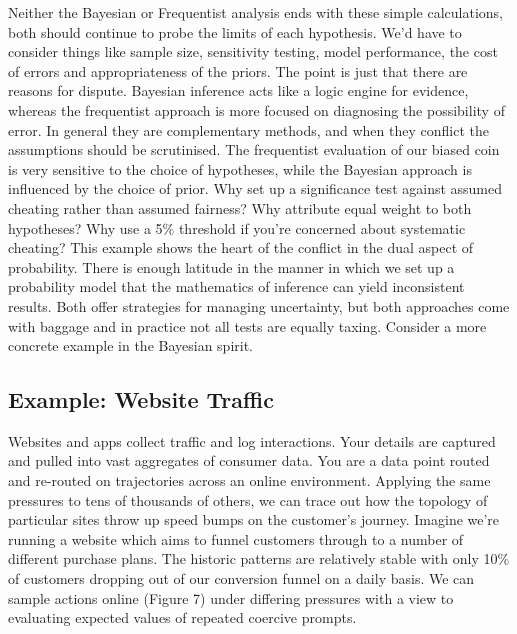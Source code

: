 \documentclass[]{tufte-book}
\theoremstyle{definition}
\theoremstyle{definition}
\theoremstyle{definition}
\theoremstyle{remark}
\begin{document}
Neither the Bayesian or Frequentist analysis ends with these simple calculations, both should continue to probe the limits of each hypothesis. We'd have to consider things like sample size, sensitivity testing, model performance, the cost of errors and appropriateness of the priors. The point is just that there are reasons for dispute. Bayesian inference acts like a logic engine for evidence, whereas the frequentist approach is more focused on diagnosing the possibility of error. In general they are complementary methods, and when they conflict the assumptions should be scrutinised. The frequentist evaluation of our biased coin is very sensitive to the choice of hypotheses, while the Bayesian approach is influenced by the choice of prior. Why set up a significance test against assumed cheating rather than assumed fairness? Why attribute equal weight to both hypotheses? Why use a 5\% threshold if you're concerned about systematic cheating? This example shows the heart of the conflict in the dual aspect of probability. There is enough latitude in the manner in which we set up a probability model that the mathematics of inference can yield inconsistent results. Both offer strategies for managing uncertainty, but both approaches come with baggage and in practice not all tests are equally taxing. Consider a more concrete example in the Bayesian spirit.

\hypertarget{example-website-traffic}{%
\subsection{Example: Website Traffic}\label{example-website-traffic}}

Websites and apps collect traffic and log interactions. Your details are captured and pulled into vast aggregates of consumer data. You are a data point routed and re-routed on trajectories across an online environment. Applying the same pressures to tens of thousands of others, we can trace out how the topology of particular sites throw up speed bumps on the customer's journey. Imagine we're running a website which aims to funnel customers through to a number of different purchase plans. The historic patterns are relatively stable with only 10\% of customers dropping out of our conversion funnel on a daily basis. We can sample actions online (Figure 7) under differing pressures with a view to evaluating expected values of repeated coercive prompts.
\end{document}
